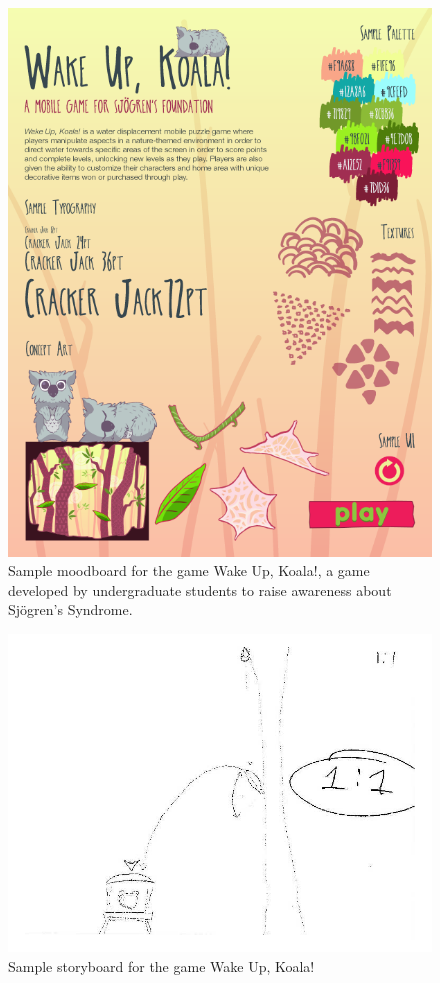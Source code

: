 \documentclass{sig-alternate-05-2015}
\begin{document}
 \begin{figure}[tb]
\centering
\includegraphics[width=\linewidth]{images/image05.png}
\caption{Sample moodboard for the game Wake Up, Koala!, a game developed by undergraduate students to raise awareness about Sj\"{o}gren's Syndrome.}
\label{figure:koalamoodboard}
\end{figure}






\begin{figure}[tb]
\centering
\includegraphics[width=\linewidth]{images/image09.jpg}
\caption{Sample storyboard for the game Wake Up, Koala!}
\label{figure:koalastoryboard}
\end{figure}
\end{document}
